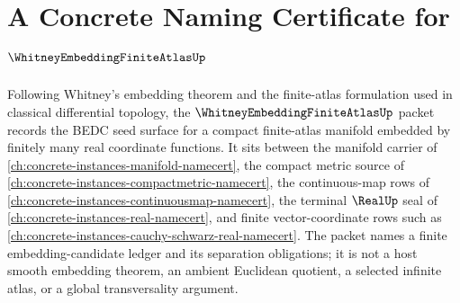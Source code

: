 \chapter{A Concrete Naming Certificate for $\WhitneyEmbeddingFiniteAtlasUp$}
\label{ch:concrete-instances-whitney-embedding-finite-atlas-namecert}

Following Whitney's embedding theorem and the finite-atlas formulation used in classical differential topology, the $\WhitneyEmbeddingFiniteAtlasUp$ packet records the BEDC seed surface for a compact finite-atlas manifold embedded by finitely many real coordinate functions. It sits between the manifold carrier of \autoref{ch:concrete-instances-manifold-namecert}, the compact metric source of \autoref{ch:concrete-instances-compactmetric-namecert}, the continuous-map rows of \autoref{ch:concrete-instances-continuousmap-namecert}, the terminal $\RealUp$ seal of \autoref{ch:concrete-instances-real-namecert}, and finite vector-coordinate rows such as \autoref{ch:concrete-instances-cauchy-schwarz-real-namecert}. The packet names a finite embedding-candidate ledger and its separation obligations; it is not a host smooth embedding theorem, an ambient Euclidean quotient, a selected infinite atlas, or a global transversality argument.

